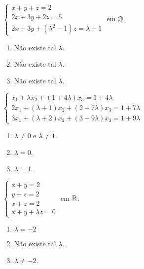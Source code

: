 \documentclass[12pt]{exam}
\begin{document}
\begin{exercicio}
  $
    \begin{cases}
      x + y + z = 2\\
      2x + 3y + 2z = 5\\
      2x + 3y + (\lambda^2 - 1)z = \lambda + 1
    \end{cases}
  $
  em $\mathbb{Q}$.
  \begin{solucao}
    \begin{enumerate}[label={\alph*})]
      \item N\~ao existe tal $\lambda$.
      \item N\~ao existe tal $\lambda$.
      \item N\~ao existe tal $\lambda$.
    \end{enumerate}
  \end{solucao}
\end{exercicio}

\begin{exercicio}
  $
    \begin{cases}
      x_1 + \lambda x_2 + (1 + 4\lambda )x_3 = 1 + 4\lambda \\
      2x_1 + (\lambda  + 1)x_2 + (2 + 7\lambda )x_3 = 1 + 7\lambda \\
      3x_1 + (\lambda  + 2)x_2 + (3 + 9\lambda )x_3 = 1 + 9\lambda 
    \end{cases}  
  $
  \begin{solucao}
    \begin{enumerate}[label={\alph*})]
      \item $\lambda \ne 0$ e $\lambda \ne 1$.
      \item $\lambda = 0$.
      \item $\lambda = 1$.
    \end{enumerate}
  \end{solucao}
\end{exercicio}

\begin{exercicio}\label{sistemasfim}
  $
    \begin{cases}
      x + y = 2\\
      y + z = 2\\
      x + z = 2\\
      x + y + \lambda z = 0
    \end{cases}
  $
  em $\mathbb{R}$.
  \begin{solucao}
    \begin{enumerate}[label={\alph*})]
      \item $\lambda = -2$
      \item N\~ao existe tal $\lambda$.
      \item $\lambda \ne -2$.
    \end{enumerate}
  \end{solucao}
\end{exercicio}
\end{document}
